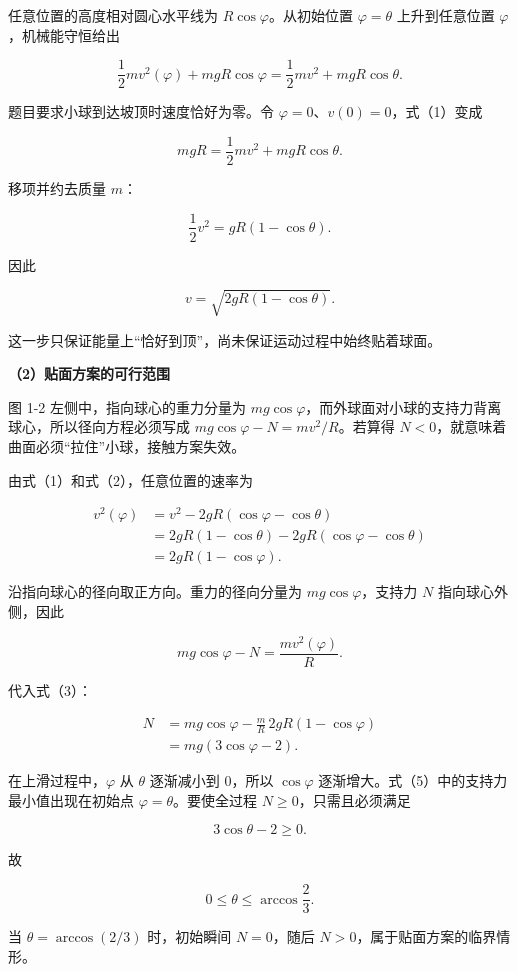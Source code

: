 \documentclass[12pt,a4paper,UTF8]{ctexart}
\begin{document}
任意位置的高度相对圆心水平线为 \(R\cos\varphi\)。从初始位置
\(\varphi=\theta\) 上升到任意位置 \(\varphi\)，机械能守恒给出

\[\frac12mv^2(\varphi)+mgR\cos\varphi
=\frac12mv^2+mgR\cos\theta. \tag{1}\]

题目要求小球到达坡顶时速度恰好为零。令
\(\varphi=0\)、\(v(0)=0\)，式（1）变成

\[mgR=\frac12mv^2+mgR\cos\theta.\]

移项并约去质量 \(m\)：

\[\frac12v^2=gR(1-\cos\theta).\]

因此

\[\boxed{v=\sqrt{2gR(1-\cos\theta)}}. \tag{2}\]

这一步只保证能量上``恰好到顶''，尚未保证运动过程中始终贴着球面。

\textbf{（2）贴面方案的可行范围}

图 1-2 左侧中，指向球心的重力分量为
\(mg\cos\varphi\)，而外球面对小球的支持力背离球心，所以径向方程必须写成
\(mg\cos\varphi-N=mv^2/R\)。若算得
\(N<0\)，就意味着曲面必须``拉住''小球，接触方案失效。

由式（1）和式（2），任意位置的速率为

\[\begin{aligned}
v^2(\varphi)
&=v^2-2gR(\cos\varphi-\cos\theta)\\
&=2gR(1-\cos\theta)-2gR(\cos\varphi-\cos\theta)\\
&=2gR(1-\cos\varphi).
\end{aligned} \tag{3}\]

沿指向球心的径向取正方向。重力的径向分量为 \(mg\cos\varphi\)，支持力
\(N\) 指向球心外侧，因此

\[mg\cos\varphi-N=\frac{mv^2(\varphi)}{R}. \tag{4}\]

代入式（3）：

\[\begin{aligned}
N
&=mg\cos\varphi-\frac{m}{R}\,2gR(1-\cos\varphi)\\
&=mg(3\cos\varphi-2).
\end{aligned} \tag{5}\]

在上滑过程中，\(\varphi\) 从 \(\theta\) 逐渐减小到 \(0\)，所以
\(\cos\varphi\) 逐渐增大。式（5）中的支持力最小值出现在初始点
\(\varphi=\theta\)。要使全过程 \(N\geq0\)，只需且必须满足

\[3\cos\theta-2\geq0.\]

故

\[\boxed{0\leq\theta\leq\arccos\frac23}. \tag{6}\]

当 \(\theta=\arccos(2/3)\) 时，初始瞬间 \(N=0\)，随后
\(N>0\)，属于贴面方案的临界情形。
\end{document}
